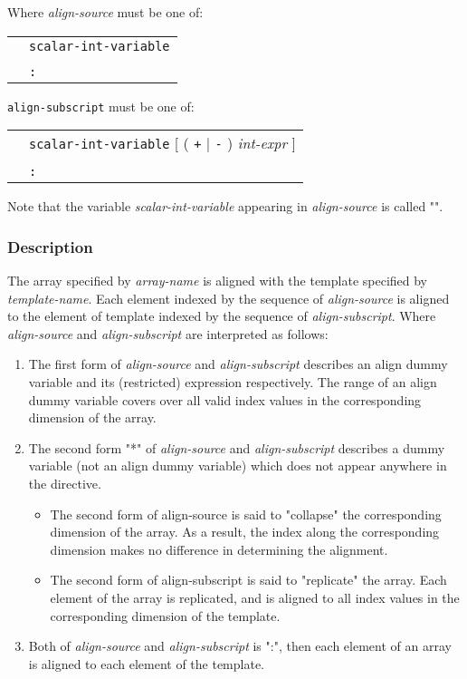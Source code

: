 Where {\it align-source} must be one of:

\begin{tabular}{ll}
 \hspace{0.5cm} & {\tt scalar-int-variable} \\
 & {\tt *} \\
 & {\tt :} \\
\end{tabular}
\vspace{0.3cm}

{\tt align-subscript} must be one of:

\begin{tabular}{ll}
 \hspace{0.5cm} & {\tt scalar-int-variable} [ ( {\tt +} $\vert$ {\tt -} )
 {\it int-expr} ] \\
 & {\tt *} \\
 & {\tt :} \\
\end{tabular}
\vspace{0.3cm}

Note that the variable {\it scalar-int-variable} appearing in {\it
  align-source} is called "". 

\subsubsection*{Description}
The array specified by {\it array-name} is
aligned with the template specified by {\it template-name}. Each element
indexed by the sequence of {\it align-source} is aligned to the element of
template indexed by the sequence of {\it align-subscript}. 
Where {\it align-source} and {\it align-subscript} are interpreted as
follows:  

\begin{enumerate}
\item The first form of
{\it align-source} and {\it align-subscript} describes an align dummy
variable and its (restricted) expression respectively. The range of an align dummy
variable covers over all valid index values in the corresponding
dimension of the array.
\item The second form "*" of {\it align-source} and {\it
    align-subscript} describes a dummy variable (not an align dummy
  variable) which does 
not appear anywhere in the directive.
\begin{itemize} 
\item The second form of align-source is said to "collapse"
the corresponding dimension of the array. As a result, the index along the
corresponding dimension makes no difference in determining the
alignment.
\item The second form of align-subscript is said to "replicate"
the array. Each element of the array is replicated, and is aligned to
all index values in the corresponding dimension of the template.
\end{itemize}
\item Both of {\it align-source} and {\it align-subscript} is ":",
  then each element of an array 
is aligned to each element of the template.
\end{enumerate}

